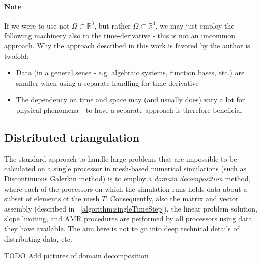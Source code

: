 \paragraph{Note}
If we were to use not $\Omega\subset\mathbb{R}^3$, but rather $\Omega\subset\mathbb{R}^4$, we may just employ the following machinery also to the time-derivative - this is not an uncommon approach. Why the approach described in this work is favored by the author is twofold:
\begin{itemize}
    \item Data (in a general sense - e.g. algebraic systems, function bases, etc.) are smaller when using a separate handling for time-derivative
    \item The dependency on time and space may (and usually does) vary a lot for physical phenomena - to have a separate approach is therefore beneficial
\end{itemize}
\subsection{Distributed triangulation}
The standard approach to handle large problems that are impossible to be calculated on a single processor in mesh-based numerical simulations (such as Discontinuous Galerkin method) is to employ a \textit{domain decomposition} method, where each of the processors on which the simulation runs holds data about a subset of elements of the mesh $T$.
Consequently, also the matrix and vector assembly (described in ~\ref{algorithm:singleTimeStep}), the linear problem solution, slope limiting, and AMR procedures are performed by all processors using data they have available. The aim here is not to go into deep technical details of distributing data, etc.

TODO Add pictures of domain decomposition